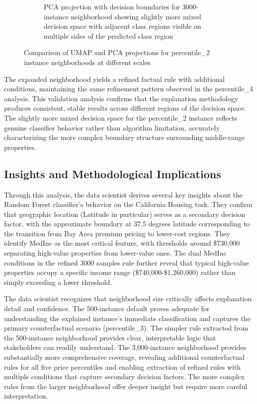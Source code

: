 \begin{figure}[ht]
\begin{subfigure}[c]{0.48\textwidth}
    \caption{PCA projection with decision boundaries for 3000-instance neighborhood showing slightly more mixed decision space with adjacent class regions visible on multiple sides of the predicted class region}
    \label{fig:ds_p2_scatter_pca_3000}
\end{subfigure}
\caption{Comparison of UMAP and PCA projections for percentile\_2 instance neighborhoods at different scales}
\label{fig:ds_p2_projections}
\end{figure}

The expanded neighborhood yields a refined factual rule with additional conditions, maintaining the same refinement pattern observed in the percentile\_4 analysis. 
This validation analysis confirms that the explanation methodology produces consistent, stable results across different regions of the decision space. 
The slightly more mixed decision space for the percentile\_2 instance reflects genuine classifier behavior rather than algorithm limitation, accurately characterizing the more complex boundary structure surrounding middle-range properties.

\subsection{Insights and Methodological Implications}

Through this analysis, the data scientist derives several key insights about the Random Forest classifier's behavior on the California Housing task. They confirm that geographic location (Latitude in particular) serves as a secondary decision factor, with the approximate boundary at 37.5 degrees latitude corresponding to the transition from Bay Area premium pricing to lower-cost regions. They identify MedInc as the most critical feature, with thresholds around \$730,000 separating high-value properties from lower-value ones. The dual MedInc conditions in the refined 3000 samples rule further reveal that typical high-value properties occupy a specific income range (\$740,000-\$1,260,000) rather than simply exceeding a lower threshold.

The data scientist recognizes that neighborhood size critically affects explanation detail and confidence. The 500-instance default proves adequate for understanding the explained instance's immediate classification and captures the primary counterfactual scenario (percentile\_3). The simpler rule extracted from the 500-instance neighborhood provides clear, interpretable logic that stakeholders can readily understand. The 3,000-instance neighborhood provides substantially more comprehensive coverage, revealing additional counterfactual rules for all five price percentiles and enabling extraction of refined rules with multiple conditions that capture secondary decision factors. The more complex rules from the larger neighborhood offer deeper insight but require more careful interpretation.

